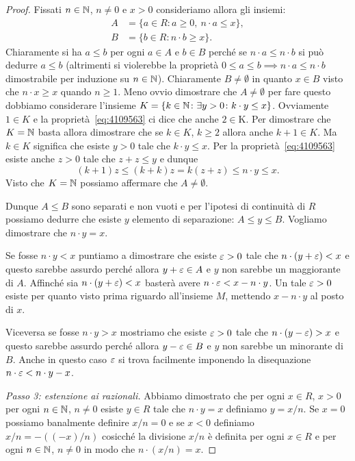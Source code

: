 \begin{proof}
Fissati $n\in {\mathbb N}$, $n\neq 0$ e $x>0$ 
consideriamo allora gli insiemi:
\begin{align*}
  A &= \{a\in R\colon a\ge 0,\ n\cdot a\le x\},\\
  B &= \{b\in R\colon n\cdot b\ge x\}.
\end{align*}
Chiaramente si ha $a\le b$ per ogni $a\in A$ e $b\in B$ 
perché se $n\cdot a \le n\cdot b$ 
si può dedurre $a\le b$ (altrimenti si violerebbe
la proprietà $0\le a\le b \implies n\cdot a\le n\cdot b$ dimostrabile 
per induzione su $n\in {\mathbb N}$).
Chiaramente $B\neq \emptyset$ in quanto $x\in B$ visto che $n\cdot x\ge x$ quando 
$n\ge 1$.
Meno ovvio dimostrare che $A\neq \emptyset$ per fare questo
dobbiamo considerare l'insieme 
$K=\{k\in{\mathbb N}\colon \exists y>0\colon k\cdot y\le x\}$.
Ovviamente $1\in K$ e la proprietà~\eqref{eq:4109563}
ci dice che anche $2\in $K. 
Per dimostrare che $K={\mathbb N}$ basta allora dimostrare che 
se $k\in K$, $k\ge 2$ allora anche $k+1\in K$. 
Ma $k\in K$ significa che esiste $y>0$ tale che 
$k\cdot y\le x$. 
Per la proprietà~\eqref{eq:4109563} esiste anche $z>0$ 
tale che $z+z\le y$ e dunque 
\[
  (k+1)z \le (k+k)z = k(z+z)\le n\cdot y \le x.
\]
Visto che $K = {\mathbb N}$ possiamo affermare che $A\neq \emptyset$.

Dunque $A\le B$ sono separati e non vuoti e per l'ipotesi di continuità di $R$ 
possiamo dedurre che esiste $y$ elemento di separazione: $A\le y \le B$.
Vogliamo dimostrare che $n\cdot y=x$.

Se fosse $n\cdot y<x$ puntiamo a dimostrare che esiste $\varepsilon>0$ 
tale che $n\cdot(y+\varepsilon)<x$ e questo sarebbe assurdo perché
allora $y+\varepsilon\in A$ e $y$ non sarebbe un maggiorante di $A$.
Affinché sia $n\cdot(y+\varepsilon)<x$ basterà avere $n\cdot \varepsilon < x-n\cdot y$.
Un tale $\varepsilon>0$ esiste per quanto visto prima riguardo all'insieme 
$M$, mettendo $x-n\cdot y$ al posto di $x$.

Viceversa se fosse $n\cdot y>x$ mostriamo che esiste $\varepsilon>0$
tale che $n\cdot(y-\varepsilon)>x$ e questo sarebbe assurdo perché
allora $y-\varepsilon\in B$ e $y$ non sarebbe un minorante di $B$.
Anche in questo caso $\varepsilon$ si trova facilmente imponendo 
la disequazione $n\cdot \varepsilon < n\cdot y-x$.

\emph{Passo 3: estenzione ai razionali.} 
Abbiamo dimostrato che per ogni $x\in R$, $x>0$ per ogni $n\in {\mathbb N}$, $n\neq 0$ 
esiste $y\in R$ tale che $n\cdot y=x$ definiamo $y=x/n$. 
Se $x=0$ possiamo banalmente definire $x/n=0$ 
e se $x<0$ definiamo $x/n = -((-x)/n)$ cosicché la divisione $x/n$ 
è definita per ogni $x\in R$ e per ogni $n\in {\mathbb N}$, $n\neq 0$ in modo che $n\cdot (x/n)=x$.


\end{proof}
